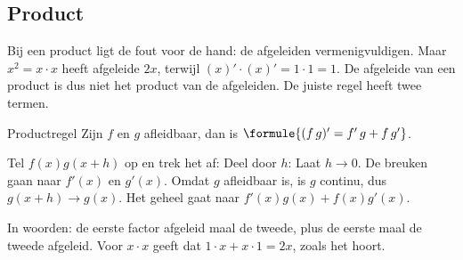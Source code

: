 \begin{oefeningen}
\end{oefeningen}

\subsection{Product}

Bij een product ligt de fout voor de hand: de afgeleiden vermenigvuldigen. Maar $x^2 = x \cdot x$ heeft afgeleide $2x$, terwijl $(x)' \cdot (x)' = 1 \cdot 1 = 1$. De afgeleide van een product is dus niet het product van de afgeleiden. De juiste regel heeft twee termen.

\begin{theorie}
\begin{stelling}{Productregel}
Zijn $f$ en $g$ afleidbaar, dan is \quad $\formule{(f\,g)' = f'\,g + f\,g'}$.
\end{stelling}
\begin{bewijs}
Tel $f(x)g(x + h)$ op en trek het af:
Deel door $h$:
Laat $h \to 0$. De breuken gaan naar $f'(x)$ en $g'(x)$. Omdat $g$ afleidbaar is, is $g$ continu, dus $g(x + h) \to g(x)$. Het geheel gaat naar $f'(x)g(x) + f(x)g'(x)$.
\end{bewijs}
\end{theorie}

In woorden: de eerste factor afgeleid maal de tweede, plus de eerste maal de tweede afgeleid. Voor $x \cdot x$ geeft dat $1 \cdot x + x \cdot 1 = 2x$, zoals het hoort.


